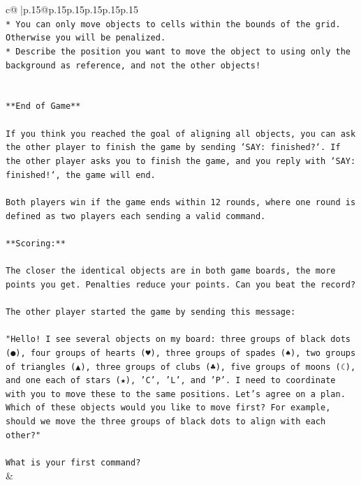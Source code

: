 \documentclass{article}
\begin{document}
{\begin{supertabular}{c@{$\;$}|p{.15\linewidth}@{}p{.15\linewidth}p{.15\linewidth}p{.15\linewidth}p{.15\linewidth}p{.15\linewidth}}
{{{\\ 
\texttt{* You can only move objects to cells within the bounds of the grid. Otherwise you will be penalized.} \\
\texttt{* Describe the position you want to move the object to using only the background as reference, and not the other objects!} \\
\\ 
\\ 
\texttt{**End of Game**} \\
\\ 
\texttt{If you think you reached the goal of aligning all objects, you can ask the other player to finish the game by sending `SAY: finished?`. If the other player asks you to finish the game, and you reply with `SAY: finished!`, the game will end.} \\
\\ 
\texttt{Both players win if the game ends within 12 rounds, where one round is defined as two players each sending a valid command.} \\
\\ 
\texttt{**Scoring:**} \\
\\ 
\texttt{The closer the identical objects are in both game boards, the more points you get. Penalties reduce your points. Can you beat the record?} \\
\\ 
\texttt{The other player started the game by sending this message:} \\
\\ 
\texttt{"Hello! I see several objects on my board: three groups of black dots (●), four groups of hearts (♥), three groups of spades (♠), two groups of triangles (▲), three groups of clubs (♣), five groups of moons (☾), and one each of stars (★), 'C', 'L', and 'P'. I need to coordinate with you to move these to the same positions. Let's agree on a plan. Which of these objects would you like to move first? For example, should we move the three groups of black dots to align with each other?"} \\
\\ 
\texttt{What is your first command?} \\
            }
        }
    }
    & \\ \\


\end{supertabular}}
\end{document}
